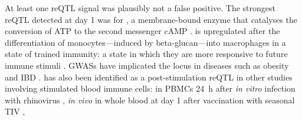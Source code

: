 At least one \gls{reQTL} signal was plausibly not a false positive.
The strongest \gls{reQTL} detected at day 1 was for , a membrane-bound enzyme that catalyses the conversion of ATP to the second messenger cAMP \autocite{wu2016AdenylateCyclaseNew}.
 is upregulated after the differentiation of monocytes---induced by beta-glucan---into macrophages in a state of trained immunity: a state in which they are more responsive to future immune stimuli \autocite{saeed2014EpigeneticProgrammingMonocytetomacrophage}.
\Glspl{GWAS} have implicated the  locus in diseases such as obesity \autocite{wu2016AdenylateCyclaseNew} and \gls{IBD} \autocite{delange2017GenomewideAssociationStudy}.
 has also been identified as a post-stimulation \gls{reQTL} in other studies involving stimulated blood immune cells:
in \glspl{PBMC} \SI{24}{\hour} after \textit{in vitro} infection with rhinovirus \autocite{caliskan2015HostGeneticVariation},
\textit{in vivo} in whole blood at day 1 after vaccination with seasonal \gls{TIV} \autocite{franco2013IntegrativeGenomicAnalysis},

